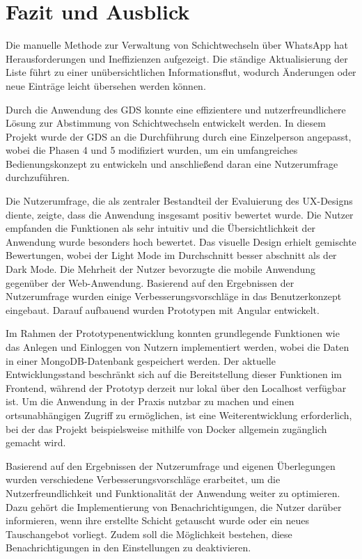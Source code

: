 \chapter{Fazit und Ausblick}

Die manuelle Methode zur Verwaltung von Schichtwechseln über WhatsApp hat Herausforderungen und Ineffizienzen aufgezeigt. Die ständige Aktualisierung der Liste führt zu einer unübersichtlichen Informationsflut, wodurch Änderungen oder neue Einträge leicht übersehen werden können.

Durch die Anwendung des GDS konnte eine effizientere und nutzerfreundlichere Lösung zur Abstimmung von Schichtwechseln entwickelt werden. In diesem Projekt wurde der GDS an die Durchführung durch eine Einzelperson angepasst, wobei die Phasen 4 und 5 modifiziert wurden, um ein umfangreiches Bedienungskonzept zu entwickeln und anschließend daran eine Nutzerumfrage durchzuführen.

Die Nutzerumfrage, die als zentraler Bestandteil der Evaluierung des UX-Designs diente, zeigte, dass die Anwendung insgesamt positiv bewertet wurde. Die Nutzer empfanden die Funktionen als sehr intuitiv und die Übersichtlichkeit der Anwendung wurde besonders hoch bewertet. Das visuelle Design erhielt gemischte Bewertungen, wobei der Light Mode im Durchschnitt besser abschnitt als der Dark Mode. Die Mehrheit der Nutzer bevorzugte die mobile Anwendung gegenüber der Web-Anwendung. Basierend auf den Ergebnissen der Nutzerumfrage wurden einige Verbesserungsvorschläge in das Benutzerkonzept eingebaut. Darauf aufbauend wurden Prototypen mit Angular entwickelt.

Im Rahmen der Prototypenentwicklung konnten grundlegende Funktionen wie das Anlegen und Einloggen von Nutzern implementiert werden, wobei die Daten in einer MongoDB-Datenbank gespeichert werden. Der aktuelle Entwicklungsstand beschränkt sich auf die Bereitstellung dieser Funktionen im Frontend, während der Prototyp derzeit nur lokal über den Localhost verfügbar ist. Um die Anwendung in der Praxis nutzbar zu machen und einen ortsunabhängigen Zugriff zu ermöglichen, ist eine Weiterentwicklung erforderlich, bei der das Projekt beispielsweise mithilfe von Docker allgemein zugänglich gemacht wird.

Basierend auf den Ergebnissen der Nutzerumfrage und eigenen Überlegungen wurden verschiedene Verbesserungsvorschläge erarbeitet, um die Nutzerfreundlichkeit und Funktionalität der Anwendung weiter zu optimieren. Dazu gehört die Implementierung von Benachrichtigungen, die Nutzer darüber informieren, wenn ihre erstellte Schicht getauscht wurde oder ein neues Tauschangebot vorliegt. Zudem soll die Möglichkeit bestehen, diese Benachrichtigungen in den Einstellungen zu deaktivieren. 

